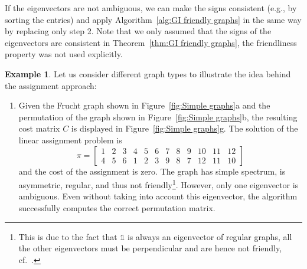 \documentclass
[
    a4paper,
    DIV=11,
    abstracton
]
{scrartcl}
\theoremstyle{definition}
\newtheorem{example}[theorem]{Example}
\begin{document}
If the eigenvectors are not ambiguous, we can make the signs consistent (e.g., by sorting the entries) and apply Algorithm~\ref{alg:GI friendly graphs} in the same way by replacing only step 2. Note that we only assumed that the signs of the eigenvectors are consistent in Theorem~\ref{thm:GI friendly graphs}, the friendliness property was not used explicitly.

\begin{example} \label{ex:GI distint eigenvalues}
Let us consider different graph types to illustrate the idea behind the assignment approach:

\begin{enumerate}[leftmargin=0em,itemindent=1.7em,labelsep=0.3em,label=\roman*)] \setlength{\itemsep}{0mm}
\item Given the Frucht graph shown in Figure~\ref{fig:Simple graphs}a and the permutation of the graph shown in Figure~\ref{fig:Simple graphs}b, the resulting cost matrix $ C $ is displayed in Figure~\ref{fig:Simple graphs}g. The solution of the linear assignment problem is
\begin{equation*}
    \pi =
    \begin{bmatrix}
        1 & 2 & 3 & 4 & 5 & 6 & 7 & 8 & 9 & 10 & 11 & 12 \\
        4 & 5 & 6 & 1 & 2 & 3 & 9 & 8 & 7 & 12 & 11 & 10
    \end{bmatrix}
\end{equation*}
and the cost of the assignment is zero. The graph has simple spectrum, is asymmetric, regular, and thus not friendly\footnote{This is due to the fact that $ \mathds{1} $ is always an eigenvector of regular graphs, all the other eigenvectors must be perpendicular and are hence not friendly, cf.~\cite{FS15}.}. However, only one eigenvector is ambiguous. Even without taking into account this eigenvector, the algorithm successfully computes the correct permutation matrix.


\end{enumerate}
\end{example}
\end{document}
